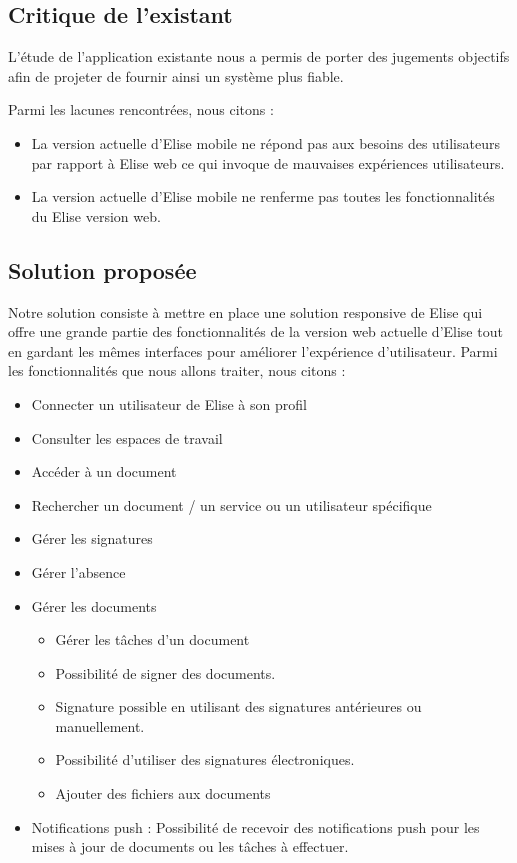 \subsection{Critique de l'existant}
L'étude de l'application existante nous a permis de porter des jugements objectifs afin de projeter de fournir ainsi un système plus fiable.

Parmi les lacunes rencontrées, nous citons :
\begin{itemize}
  \item La version actuelle d'Elise mobile ne répond pas aux besoins des utilisateurs par rapport à Elise web ce qui invoque de mauvaises expériences utilisateurs.
  \item La version actuelle d'Elise mobile ne renferme pas toutes les fonctionnalités du Elise version web.
\end{itemize}

\subsection{Solution proposée}
Notre solution consiste à mettre en place une solution responsive de Elise qui offre une grande partie des fonctionnalités de la version web actuelle d'Elise tout en gardant les mêmes interfaces pour améliorer l'expérience d'utilisateur. Parmi les fonctionnalités que nous allons traiter, nous citons :

\begin{itemize}
  \item Connecter un utilisateur de Elise à son profil
  \item Consulter les espaces de travail
  \item Accéder à un document
  \item Rechercher un document / un service ou un utilisateur spécifique
  \item Gérer les signatures
  \item Gérer l'absence
  \item Gérer les documents
  \begin{itemize}
    \item Gérer les tâches d'un document
    \item Possibilité de signer des documents.
    \item Signature possible en utilisant des signatures antérieures ou manuellement.
    \item Possibilité d'utiliser des signatures électroniques.
    \item	Ajouter des fichiers aux documents
  \end{itemize}
  \item Notifications push : Possibilité de recevoir des notifications push pour les mises à jour de documents ou les tâches à effectuer.
\end{itemize}

